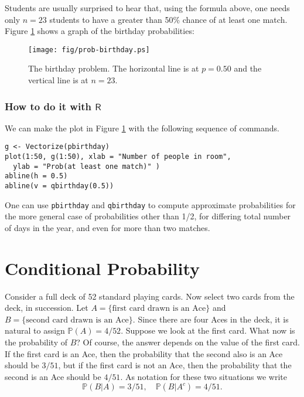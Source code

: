 Students are usually surprised to hear that, using the formula above,
one needs only \(n=23\) students to have a greater than 50\% chance of
at least one match. Figure \ref{fig-birthday} shows a graph of the birthday
probabilities:

\begin{figure}[ht!]
\centering
\texttt{[image: fig/prob-birthday.ps]}
\caption[The birthday problem]{\label{fig-birthday}\small The birthday problem. The horizontal line is at \(p=0.50\) and the vertical line is at \(n=23\).}
\end{figure}

\subsubsection{How to do it with \(\mathsf{R}\)}
\label{sec-4-5-2-3}

We can make the plot in Figure \ref{fig-birthday} with the following
sequence of commands.

\begin{Verbatim}
g <- Vectorize(pbirthday)
plot(1:50, g(1:50), xlab = "Number of people in room", 
  ylab = "Prob(at least one match)" )
abline(h = 0.5)
abline(v = qbirthday(0.5))
\end{Verbatim}

One can use \texttt{pbirthday} and \texttt{qbirthday} to
compute approximate probabilities for the more general case of
probabilities other than 1/2, for differing total number of days in
the year, and even for more than two matches.

\section{Conditional Probability}
\label{sec-4-6}

Consider a full deck of 52 standard playing cards. Now select two
cards from the deck, in succession. Let \( A = \{ \mbox{first card
drawn is an Ace} \} \) and \( B = \{ \mbox{second card drawn is an
Ace} \} \). Since there are four Aces in the deck, it is natural to
assign \( \mathbb{P}(A) = 4/52 \). Suppose we look at the first
card. What now is the probability of \(B\)? Of course, the answer
depends on the value of the first card. If the first card is an Ace,
then the probability that the second also is an Ace should be \( 3/51
\), but if the first card is not an Ace, then the probability that the
second is an Ace should be \( 4/51 \). As notation for these two
situations we write 
\[ \mathbb{P}(B|A)=3/51,\quad
\mathbb{P}(B|A^{c})=4/51.  
\]

